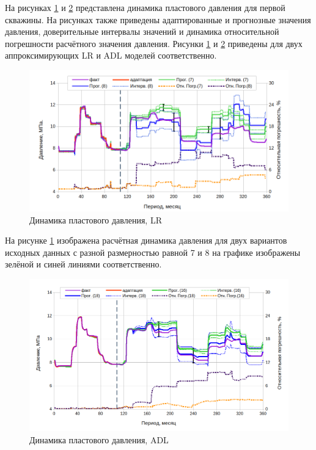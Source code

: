 \documentclass[14pt]{article}
\begin{document}
 	
 	На рисунках \ref{fig:ppllinregw1} и \ref{fig:ppladlw1} представлена динамика пластового давления для первой скважины. На рисунках также приведены адаптированные и прогнозные значения давления, доверительные интервалы значений и динамика относительной погрешности расчётного значения давления. Рисунки \ref{fig:ppllinregw1} и \ref{fig:ppladlw1} приведены для двух аппроксимирующих LR и ADL моделей соответственно.
 	
 \begin{figure}
 	\centering
 	\includegraphics[width=0.9\linewidth]{ppl_lin_reg_w1}
 	\caption{Динамика пластового давления, LR}
 	\label{fig:ppllinregw1}
 \end{figure}
 
 	На рисунке \ref{fig:ppllinregw1} изображена расчётная динамика давления для двух вариантов исходных данных с разной размерностью равной 7 и 8 на графике изображены зелёной и синей линиями соответственно. 
 
 \begin{figure}
 	\centering
 	\includegraphics[width=0.9\linewidth]{ppl_adl_w1}
 	\caption{Динамика пластового давления, ADL}
 	\label{fig:ppladlw1}
 \end{figure}
 
\end{document}
